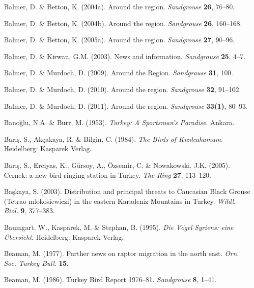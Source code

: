 \documentclass[
  a4paper,
  DIV=11,
  numbers=noendperiod]{scrreprt}
\newlength{\cslhangindent}
\newenvironment{CSLReferences}[2] %
 {\begin{list}{}{%
  \setlength{\itemindent}{0pt}
  \setlength{\leftmargin}{0pt}
  \setlength{\parsep}{0pt}
  \ifodd #1
   \setlength{\leftmargin}{\cslhangindent}
   \setlength{\itemindent}{-1\cslhangindent}
  \fi
  \setlength{\itemsep}{#2\baselineskip}}}
 {\end{list}}
\begin{document}
\begin{CSLReferences}{1}{1}
Balmer, D. \& Betton, K. (2004a). {Around the region}. \emph{Sandgrouse}
\textbf{26}, 76--80.

Balmer, D. \& Betton, K. (2004b). {Around the region}. \emph{Sandgrouse}
\textbf{26}, 160--168.

Balmer, D. \& Betton, K. (2005a). {Around the region}. \emph{Sandgrouse}
\textbf{27}, 90--96.

Balmer, D. \& Kirwan, G.M. (2003). {News and information}.
\emph{Sandgrouse} \textbf{25}, 4--7.

Balmer, D. \& Murdoch, D. (2009). {Around the Region}. \emph{Sandgrouse}
\textbf{31}, 100.

Balmer, D. \& Murdoch, D. (2010). Around the region. \emph{Sandgrouse}
\textbf{32}, 91--102.

Balmer, D. \& Murdoch, D. (2011). {Around the region}. \emph{Sandgrouse}
\textbf{33(1)}, 80--93.

Banoğlu, N.A. \& Burr, M. (1953). \emph{{Turkey: A Sportsman's
Paradise}}. Ankara.

Barış, S., Akçakaya, R. \& Bilgin, C. (1984). \emph{{The Birds of
Kızılcahamam}}. Heidelberg: Kasparek Verlag.

Barış, S., Erciyas, K., Gürsoy, A., Özsemir, C. \& Nowakowski, J.K.
(2005). {Cernek: a new bird ringing station in Turkey}. \emph{The Ring}
\textbf{27}, 113--120.

Başkaya, S. (2003). {Distribution and principal threats to Caucasian
Black Grouse ({Tetrao mlokosiewiczi}) in the eastern Karadeniz Mountains
in Turkey}. \emph{Wildl. Biol.} \textbf{9}, 377--383.

Baumgart, W., Kasparek, M. \& Stephan, B. (1995). \emph{{Die Vögel
Syriens: eine Übersicht}}. Heidelberg: Kasparek Verlag.

Beaman, M. (1977). {Further news on raptor migration in the north east}.
\emph{Orn. Soc. Turkey Bull.} \textbf{15}.

Beaman, M. (1986). {Turkey Bird Report 1976--81}. \emph{Sandgrouse}
\textbf{8}, 1--41.


\end{CSLReferences}
\end{document}
